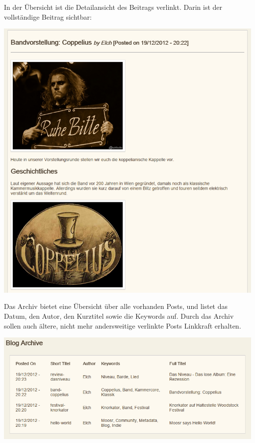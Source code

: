 In der Übersicht ist die Detailansicht des Beitrags verlinkt. Darin ist der
vollständige Beitrag sichtbar: 

\begin{center}
\includegraphics[width=\textwidth]{../screenshots/blog_detail.png}
\end{center}

Das Archiv bietet eine Übersicht über alle vorhanden Posts, und listet das
Datum, den Autor, den Kurztitel sowie die Keywords auf. Durch das Archiv sollen
auch ältere, nicht mehr andersweitige verlinkte Posts Linkkraft erhalten.

\begin{center}
\includegraphics[width=\textwidth]{../screenshots/blog_archive.png}
\end{center}


